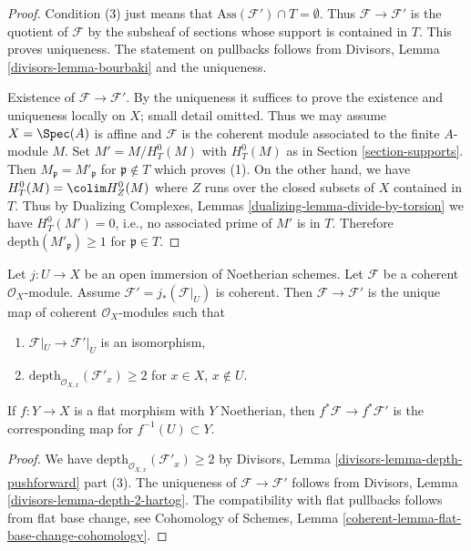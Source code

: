 \begin{proof}
Condition (3) just means that $\text{Ass}(\mathcal{F}') \cap T = \emptyset$.
Thus $\mathcal{F} \to \mathcal{F}'$ is the quotient of $\mathcal{F}$
by the subsheaf of sections whose support is contained in $T$.
This proves uniqueness. The statement on pullbacks follows from
Divisors, Lemma \ref{divisors-lemma-bourbaki}
and the uniqueness.

\medskip\noindent
Existence of $\mathcal{F} \to \mathcal{F}'$.
By the uniqueness it suffices to prove the
existence and uniqueness locally on $X$; small detail omitted.
Thus we may assume $X = \Spec(A)$ is affine and $\mathcal{F}$
is the coherent module associated to the finite $A$-module $M$.
Set $M' = M / H^0_T(M)$ with $H^0_T(M)$ as in Section \ref{section-supports}.
Then $M_\mathfrak p = M'_\mathfrak p$ for $\mathfrak p \not \in T$
which proves (1). On the other hand, we have
$H^0_T(M) = \colim H^0_Z(M)$ where $Z$ runs over the closed
subsets of $X$ contained in $T$. Thus by
Dualizing Complexes, Lemmas \ref{dualizing-lemma-divide-by-torsion}
we have $H^0_T(M') = 0$, i.e., no associated prime
of $M'$ is in $T$. Therefore $\text{depth}(M'_\mathfrak p) \geq 1$
for $\mathfrak p \in T$.
\end{proof}

\begin{lemma}
\label{lemma-get-depth-2-along-Z}
Let $j : U \to X$ be an open immersion of Noetherian schemes.
Let $\mathcal{F}$ be a coherent $\mathcal{O}_X$-module.
Assume $\mathcal{F}' = j_*(\mathcal{F}|_U)$ is coherent.
Then $\mathcal{F} \to \mathcal{F}'$ is the unique map
of coherent $\mathcal{O}_X$-modules such that
\begin{enumerate}
\item $\mathcal{F}|_U \to \mathcal{F}'|_U$
is an isomorphism,
\item $\text{depth}_{\mathcal{O}_{X, x}}(\mathcal{F}'_x) \geq 2$
for $x \in X$, $x \not \in U$.
\end{enumerate}
If $f : Y \to X$ is a flat morphism with $Y$ Noetherian, then
$f^*\mathcal{F} \to f^*\mathcal{F}'$ is the corresponding
map for $f^{-1}(U) \subset Y$.
\end{lemma}

\begin{proof}
We have $\text{depth}_{\mathcal{O}_{X, x}}(\mathcal{F}'_x) \geq 2$
by Divisors, Lemma \ref{divisors-lemma-depth-pushforward} part (3).
The uniqueness of $\mathcal{F} \to \mathcal{F}'$ follows from
Divisors, Lemma \ref{divisors-lemma-depth-2-hartog}.
The compatibility with flat pullbacks follows from
flat base change, see Cohomology of Schemes, Lemma
\ref{coherent-lemma-flat-base-change-cohomology}.
\end{proof}


